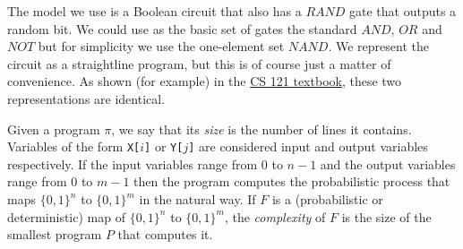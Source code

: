 The model we use is a Boolean circuit that also has a
\(\ensuremath{\mathit{RAND}}\) gate that outputs a random bit. We could
use as the basic set of gates the standard
\(\ensuremath{\mathit{AND}}\), \(\ensuremath{\mathit{OR}}\) and
\(\ensuremath{\mathit{NOT}}\) but for simplicity we use the one-element
set \(\ensuremath{\mathit{NAND}}\). We represent the circuit as a
straightline program, but this is of course just a matter of
convenience. As shown (for example) in the \href{http://introtcs.org}{CS
121 textbook}, these two representations are identical.

\hypertarget{randprogdef}{}

Given a program \(\pi\), we say that its \emph{size} is the number of
lines it contains. Variables of the form \texttt{X[}\(i\)\texttt{]} or
\texttt{Y[}\(j\)\texttt{]} are considered input and output variables
respectively. If the input variables range from \(0\) to \(n-1\) and the
output variables range from \(0\) to \(m-1\) then the program computes
the probabilistic process that maps \(\{0,1\}^n\) to \(\{0,1\}^m\) in
the natural way. If \(F\) is a (probabilistic or deterministic) map of
\(\{0,1\}^n\) to \(\{0,1\}^m\), the \emph{complexity} of \(F\) is the
size of the smallest program \(P\) that computes it.

